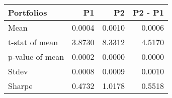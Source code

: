 \begin{tabular}{lrrr}
\toprule
Portfolios & P1 & P2 & P2 - P1 \\
\midrule
Mean & 0.0004 & 0.0010 & 0.0006 \\
t-stat of mean & 3.8730 & 8.3312 & 4.5170 \\
p-value of mean & 0.0002 & 0.0000 & 0.0000 \\
Stdev & 0.0008 & 0.0009 & 0.0010 \\
Sharpe & 0.4732 & 1.0178 & 0.5518 \\
\bottomrule
\end{tabular}
